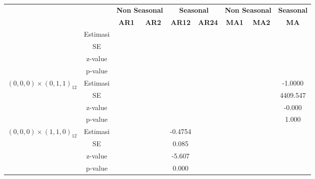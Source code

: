 \begin{enumerate}[label=\alph*.]
\begin{longtable}{|c|c|c|c|c|c|c|c|c|}
            & &
            \multicolumn{2}{c|}{\textbf{Non Seasonal}} &
            \multicolumn{2}{c|}{\textbf{Seasonal}} &
            \multicolumn{2}{c|}{\textbf{Non Seasonal}} &
            \textbf{Seasonal} \\ \cline{3-9}

            & &
            \textbf{AR1} & \textbf{AR2} &
            \textbf{AR12} & \textbf{AR24} &
            \textbf{MA1} & \textbf{MA2} &
            \textbf{MA} \\ \hline
            \endhead

            \hline
            \endfoot

            \hline
            \endlastfoot


            \hline
            \multirow{4}{*}{$(0,0,0)\times(0,1,0)_{12}$}
            & Estimasi & {} & {} & {} & {} & {} & {} & {} \\ \cline{2-9}
            & SE       & {} & {} & {} & {} & {} & {} & {}\\ \cline{2-9}
            & z-value  &  {}   & {} & {} & {} & {} & {} & {} \\ \cline{2-9}
            & p-value  & {} & {} & {} & {} & {} & {} & {} \\ \hline

            \multirow{4}{*}{$(0,0,0)\times(0,1,1)_{12}$}
            & Estimasi & {} & {} & {} & {} & {} & {} & -1.0000 \\ \cline{2-9}
            & SE       & {} & {} & {} & {} & {} & {} & 4409.547\\ \cline{2-9}
            & z-value  &  {}   & {} & {} & {} & {} & {} & -0.000 \\ \cline{2-9}
            & p-value  & {} & {} & {} & {} & {} & {} & 1.000 \\ \hline

            \multirow{4}{*}{$(0,0,0)\times(1,1,0)_{12}$}
            & Estimasi & {} & {} & -0.4754 & {} & {} & {} & {} \\ \cline{2-9}
            & SE       & {} & {} & 0.085 & {} & {} & {} & {}\\ \cline{2-9}
            & z-value  & {} & {} & -5.607 & {} & {} & {} & {}\\ \cline{2-9}
            & p-value  & {} & {} & 0.000 & {} & {} & {} & {}\\ \hline


\end{longtable}
\end{enumerate}
